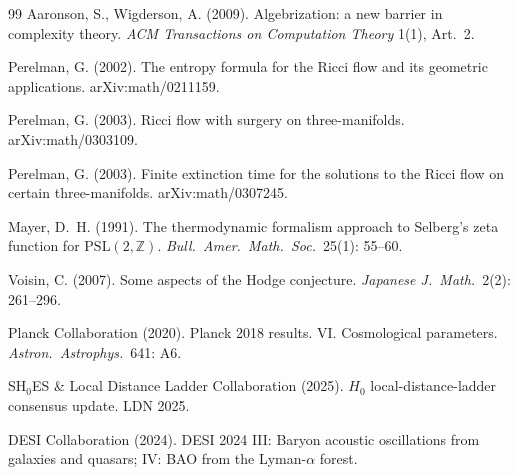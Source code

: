 \documentclass[11pt,a4paper]{article}
\theoremstyle{plain}
\theoremstyle{definition}
\begin{document}
\begin{thebibliography}{99}
Aaronson, S., Wigderson, A. (2009). Algebrization: a new barrier in
complexity theory. \emph{ACM Transactions on Computation Theory}
1(1), Art.\ 2.

Perelman, G. (2002). The entropy formula for the Ricci flow and its
geometric applications. arXiv:math/0211159.

Perelman, G. (2003). Ricci flow with surgery on three-manifolds.
arXiv:math/0303109.

Perelman, G. (2003). Finite extinction time for the solutions to
the Ricci flow on certain three-manifolds. arXiv:math/0307245.

Mayer, D.~H. (1991). The thermodynamic formalism approach to
Selberg's zeta function for $\mathrm{PSL}(2, \mathbb{Z})$.
\emph{Bull.\ Amer.\ Math.\ Soc.}\ 25(1): 55--60.

Voisin, C. (2007). Some aspects of the Hodge conjecture.
\emph{Japanese J.\ Math.}\ 2(2): 261--296.

Planck Collaboration (2020). Planck 2018 results. VI. Cosmological
parameters. \emph{Astron.\ Astrophys.}\ 641: A6.

SH$_{0}$ES \& Local Distance Ladder Collaboration (2025). $H_{0}$
local-distance-ladder consensus update. LDN 2025.

DESI Collaboration (2024). DESI 2024 III: Baryon acoustic oscillations
from galaxies and quasars; IV: BAO from the Lyman-$\alpha$ forest.

\end{thebibliography}
\end{document}
